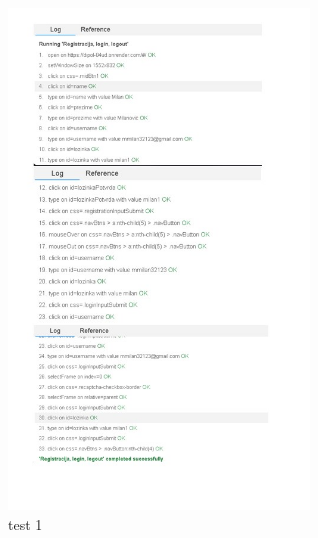 \begin{itemize}
\begin{figure}[htb]
			 				\includegraphics[width=8cm]{slike/test_1.jpg}
			 				\caption{test 1}
			 				\label{fig:fer-logo}
			 			\end{figure}
			 \end{itemize}
			 
			 \newpage
			 

